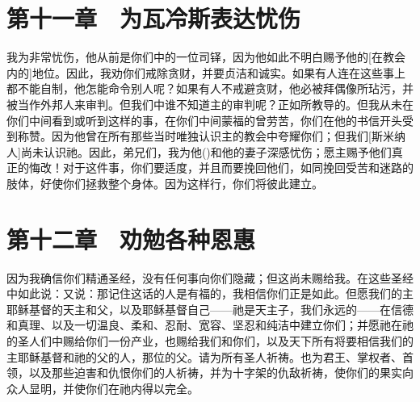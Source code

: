 
\section{第十一章　为瓦冷斯表达忧伤}

我为非常忧伤，他从前是你们中的一位司铎，因为他如此不明白赐予他的[在教会内的]地位。因此，我劝你们戒除贪财，并要贞洁和诚实。如果有人连在这些事上都不能自制，他怎能命令别人呢？如果有人不戒避贪财，他必被拜偶像所玷污，并被当作外邦人来审判。但我们中谁不知道主的审判呢？正如所教导的。但我从未在你们中间看到或听到这样的事，在你们中间蒙福的曾劳苦，你们在他的书信开头受到称赞。因为他曾在所有那些当时唯独认识主的教会中夸耀你们；但我们[斯米纳人]尚未认识祂。因此，弟兄们，我为他()和他的妻子深感忧伤；愿主赐予他们真正的悔改！对于这件事，你们要适度，并且而要挽回他们，如同挽回受苦和迷路的肢体，好使你们拯救整个身体。因为这样行，你们将彼此建立。\par


\section{第十二章　劝勉各种恩惠}

因为我确信你们精通圣经，没有任何事向你们隐藏；但这尚未赐给我。在这些圣经中如此说：又说：那记住这话的人是有福的，我相信你们正是如此。但愿我们的主耶稣基督的天主和父，以及耶稣基督自己——祂是天主子，我们永远的——在信德和真理、以及一切温良、柔和、忍耐、宽容、坚忍和纯洁中建立你们；并愿祂在祂的圣人们中赐给你们一份产业，也赐给我们和你们，以及天下所有将要相信我们的主耶稣基督和祂的父的人，那位的父。请为所有圣人祈祷。也为君王、掌权者、首领，以及那些迫害和仇恨你们的人祈祷，并为十字架的仇敌祈祷，使你们的果实向众人显明，并使你们在祂内得以完全。\par



